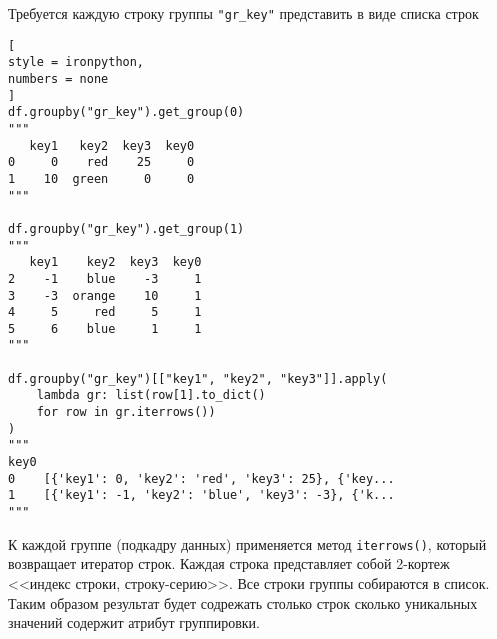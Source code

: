 \documentclass[%
	11pt,
	a4paper,
	utf8,
		]{article}
\begin{document}
Требуется каждую строку группы \verb*|"gr_key"| представить в виде списка строк
\begin{lstlisting}[
style = ironpython,
numbers = none
]
df.groupby("gr_key").get_group(0)
"""
   key1   key2  key3  key0
0     0    red    25     0
1    10  green     0     0
"""

df.groupby("gr_key").get_group(1)
"""
   key1    key2  key3  key0
2    -1    blue    -3     1
3    -3  orange    10     1
4     5     red     5     1
5     6    blue     1     1
"""

df.groupby("gr_key")[["key1", "key2", "key3"]].apply(
    lambda gr: list(row[1].to_dict()
    for row in gr.iterrows())
)
"""
key0
0    [{'key1': 0, 'key2': 'red', 'key3': 25}, {'key...
1    [{'key1': -1, 'key2': 'blue', 'key3': -3}, {'k...
"""
\end{lstlisting}

К каждой группе (подкадру данных) применяется метод \verb*|iterrows()|, который возвращает итератор строк. Каждая строка представляет собой 2-кортеж <<индекс строки, строку-серию>>. Все строки группы собираются в список. Таким образом результат будет содрежать столько строк сколько уникальных значений содержит атрибут группировки.






\begin{thebibliography}{99}
	

	
	
	
\end{thebibliography}


\end{document}
